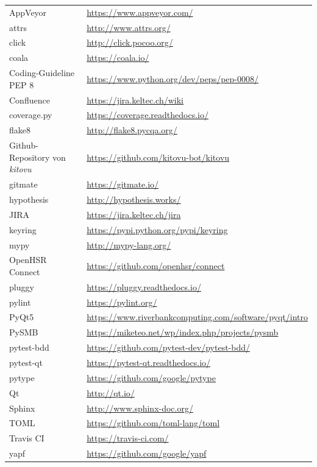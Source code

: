 \documentclass[a4paper]{article}
\def\jiraurl{https://jira.keltec.ch/jira}
\def\confluenceurl{https://jira.keltec.ch/wiki}
\begin{document}
\begin{tabulary}{\linewidth}{ll}
  AppVeyor & \url{https://www.appveyor.com/} \\
  attrs & \url{http://www.attrs.org/} \\ 
  click & \url{http://click.pocoo.org/} \\ 
  coala & \url{https://coala.io/} \\
  Coding-Guideline PEP 8 & \url{https://www.python.org/dev/peps/pep-0008/} \\
  Confluence & \url{\confluenceurl} \\
  coverage.py & \url{https://coverage.readthedocs.io/} \\
  flake8 & \url{http://flake8.pycqa.org/} \\
  Github-Repository von \emph{kitovu} & \url{https://github.com/kitovu-bot/kitovu} \\
  gitmate & \url{https://gitmate.io/} \\
  hypothesis & \url{http://hypothesis.works/} \\
  JIRA	& \url{\jiraurl} \\
  keyring & \url{https://pypi.python.org/pypi/keyring} \\ 
  mypy & \url{http://mypy-lang.org/} \\
  OpenHSR Connect & \url{https://github.com/openhsr/connect} \\
  pluggy & \url{https://pluggy.readthedocs.io/} \\ 
  pylint & \url{https://pylint.org/} \\
  PyQt5 & \url{https://www.riverbankcomputing.com/software/pyqt/intro} \\ 
  PySMB & \url{https://miketeo.net/wp/index.php/projects/pysmb} \\ 
  pytest-bdd & \url{https://github.com/pytest-dev/pytest-bdd/} \\
  pytest-qt & \url{https://pytest-qt.readthedocs.io/} \\
  pytype & \url{https://github.com/google/pytype} \\ 
  Qt & \url{http://qt.io/} \\ 
  Sphinx & \url{http://www.sphinx-doc.org/} \\
  TOML & \url{https://github.com/toml-lang/toml} \\ 
  Travis CI & \url{https://travis-ci.com/} \\
  yapf & \url{https://github.com/google/yapf} \\
\end{tabulary}
\end{document}
